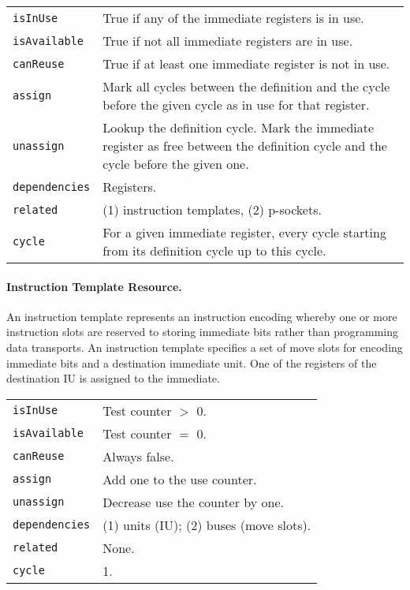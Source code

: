 \documentclass[a4paper,twoside]{tce}
\begin{document}
\begin{flushleft}
\begin{tabular*}{\textwidth}[h]{|l|@{\extracolsep{\fill}}p{}|}
  \hline
  \texttt{isInUse} &
  True if any of the immediate registers is in use.\\
  \texttt{isAvailable} &
  True if not all immediate registers are in use.\\
  \texttt{canReuse} &
  True if at least one immediate register is not in use.\\
  \texttt{assign} &
  Mark all cycles between the definition and the cycle before the given
  cycle as in use for that register.\\
  \texttt{unassign} &
  Lookup the definition cycle. Mark the immediate register as free between
  the definition cycle and the cycle before the given one.\footnotemark\\
  \texttt{dependencies} &
  Registers.\\
  \texttt{related} &
  (1) instruction templates, (2) p-sockets. \\
  \texttt{cycle} &
  For a given immediate register, every cycle starting from its definition
  cycle up to this cycle.\\
  \hline
\end{tabular*}
\end{flushleft}


\paragraph{Instruction Template Resource.}

An instruction template represents an instruction encoding whereby one or
more instruction slots are reserved to storing immediate bits rather than
programming data transports. An instruction template specifies a set of move
slots for encoding immediate bits and a destination immediate unit. One of
the registers of the destination IU is assigned to the immediate.

\begin{flushleft}
\begin{tabular*}{\textwidth}[h]{|l|@{\extracolsep{\fill}}p{}|}
  \hline
  \texttt{isInUse} &
  Test counter $>$ 0.\\
  \texttt{isAvailable} &
  Test counter $=$ 0.\\
  \texttt{canReuse} &
  Always false.\\
  \texttt{assign} &
  Add one to the use counter.\\
  \texttt{unassign} &
  Decrease use the counter by one.\\
  \texttt{dependencies} &
  (1) units (IU); (2) buses (move slots).\\
  \texttt{related} &
  None. \\
  \texttt{cycle} &
  1.\\
  \hline
\end{tabular*}
\end{flushleft}
\end{document}
